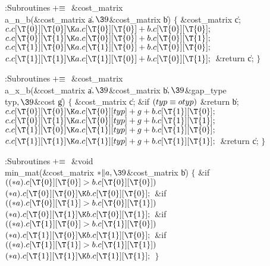 \Y\B\4:Subroutines\X${}\mathrel+\equiv{}$\6
\&{cost\_matrix} \\{a\_n\_b}(\&{cost\_matrix} \|a${},\39{}$\&{cost\_matrix} %
\|b)\6
${}\{{}$\1\6
\&{cost\_matrix} \|c;\7
${}\|c.\|c[\T{0}][\T{0}]\K\|a.\|c[\T{0}][\T{0}]+\|b.\|c[\T{0}][\T{0}];{}$\6
${}\|c.\|c[\T{0}][\T{1}]\K\|a.\|c[\T{0}][\T{0}]+\|b.\|c[\T{0}][\T{1}];{}$\6
${}\|c.\|c[\T{1}][\T{0}]\K\|a.\|c[\T{1}][\T{0}]+\|b.\|c[\T{0}][\T{0}];{}$\6
${}\|c.\|c[\T{1}][\T{1}]\K\|a.\|c[\T{1}][\T{0}]+\|b.\|c[\T{0}][\T{1}];{}$\6
\&{return} \|c;\6
\4${}\}{}$\2\par
\fi

\B{}:Subroutines\X${}\mathrel+\equiv{}$\6
\&{cost\_matrix} \\{a\_x\_b}(\&{cost\_matrix} \|a${},\39{}$\&{cost\_matrix} %
\|b${},\39{}$\&{gap\_type} \\{typ}${},\39{}$\&{cost} \|g)\6
${}\{{}$\1\6
\&{cost\_matrix} \|c;\7
\&{if} ${}(\\{typ}\equiv\\{otyp}){}$\1\5
\&{return} \|b;\2\6
${}\|c.\|c[\T{0}][\T{0}]\K\|a.\|c[\T{0}][\\{typ}]+\|g+\|b.\|c[\T{1}][\T{0}];{}$%
\6
${}\|c.\|c[\T{0}][\T{1}]\K\|a.\|c[\T{0}][\\{typ}]+\|g+\|b.\|c[\T{1}][\T{1}];{}$%
\6
${}\|c.\|c[\T{1}][\T{0}]\K\|a.\|c[\T{1}][\\{typ}]+\|g+\|b.\|c[\T{1}][\T{0}];{}$%
\6
${}\|c.\|c[\T{1}][\T{1}]\K\|a.\|c[\T{1}][\\{typ}]+\|g+\|b.\|c[\T{1}][\T{1}];{}$%
\6
\&{return} \|c;\6
\4${}\}{}$\2\par
\fi

\B{}:Subroutines\X${}\mathrel+\equiv{}$\6
\&{void} \\{min\_mat}(\&{cost\_matrix} ${}{*}\|a,\39{}$\&{cost\_matrix} \|b)\6
${}\{{}$\1\6
\&{if} ${}(({*}\|a).\|c[\T{0}][\T{0}]>\|b.\|c[\T{0}][\T{0}]){}$\1\5
${}({*}\|a).\|c[\T{0}][\T{0}]\K\|b.\|c[\T{0}][\T{0}];{}$\2\6
\&{if} ${}(({*}\|a).\|c[\T{0}][\T{1}]>\|b.\|c[\T{0}][\T{1}]){}$\1\5
${}({*}\|a).\|c[\T{0}][\T{1}]\K\|b.\|c[\T{0}][\T{1}];{}$\2\6
\&{if} ${}(({*}\|a).\|c[\T{1}][\T{0}]>\|b.\|c[\T{1}][\T{0}]){}$\1\5
${}({*}\|a).\|c[\T{1}][\T{0}]\K\|b.\|c[\T{1}][\T{0}];{}$\2\6
\&{if} ${}(({*}\|a).\|c[\T{1}][\T{1}]>\|b.\|c[\T{1}][\T{1}]){}$\1\5
${}({*}\|a).\|c[\T{1}][\T{1}]\K\|b.\|c[\T{1}][\T{1}];{}$\2\6
\4${}\}{}$\2\par
\fi

